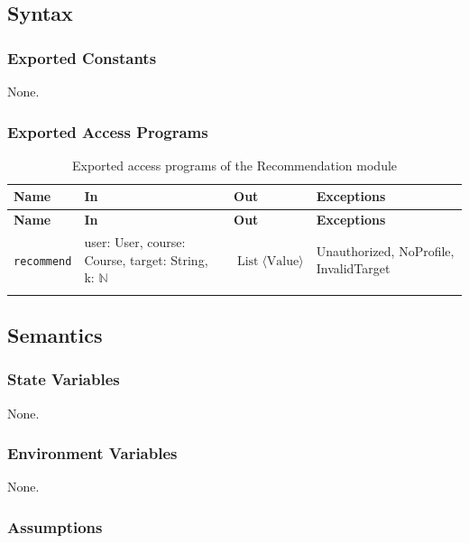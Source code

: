 \documentclass[12pt, titlepage]{article}
\begin{document}
\subsection{Syntax}

\subsubsection{Exported Constants}
None.

\subsubsection{Exported Access Programs}

\begingroup
\small
\setlength{\tabcolsep}{4pt}
\renewcommand{\arraystretch}{1.2}
\begin{longtable}{>{\raggedright\arraybackslash}p{}
                  >{\raggedright\arraybackslash}p{}
                  >{\raggedright\arraybackslash}p{}
                  >{\raggedright\arraybackslash}p{}}
\toprule
\textbf{Name} & \textbf{In} & \textbf{Out} & \textbf{Exceptions} \\
\midrule
\endfirsthead
\toprule
\textbf{Name} & \textbf{In} & \textbf{Out} & \textbf{Exceptions} \\
\midrule
\endhead
\endfoot
\texttt{recommend} & user: User, course: Course, target: String, k: $\mathbb{N}$ & $\operatorname{List}\langle\text{Value}\rangle$ & Unauthorized, NoProfile, InvalidTarget \\
\bottomrule
\caption{Exported access programs of the Recommendation module}
\label{TblRecommendationAccessPrograms}
\end{longtable}
\endgroup

\subsection{Semantics}

\subsubsection{State Variables}
None.

\subsubsection{Environment Variables}
None.

\subsubsection{Assumptions}
\end{document}
